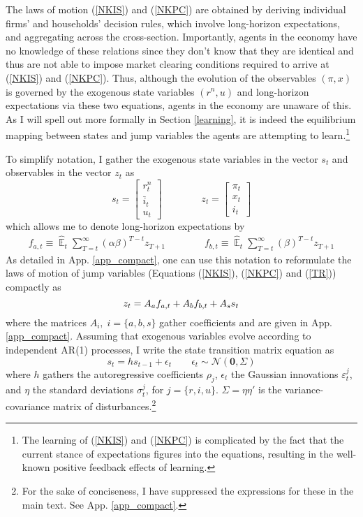 \documentclass[11pt]{article}
\renewcommand{\[}{\begin{equation}}
\renewcommand{\]}{\end{equation}}
\DeclareMathOperator{\E}{\mathbb{E}}
\begin{document}
The laws of motion (\ref{NKIS}) and (\ref{NKPC}) are obtained by deriving individual firms' and households' decision rules, which involve long-horizon expectations, and aggregating across the cross-section. Importantly, agents in the economy have no knowledge of these relations since they don't know that they are identical and thus are not able to impose market clearing conditions required to arrive at (\ref{NKIS}) and (\ref{NKPC}). Thus, although the evolution of the observables $(\pi,x)$ is governed by the exogenous state variables $(r^n, u)$ and long-horizon expectations via these two equations, agents in the economy are unaware of this. As I will spell out more formally in Section \ref{learning}, it is indeed the equilibrium mapping between states and jump variables the agents are attempting to learn.\footnote{The learning of (\ref{NKIS}) and (\ref{NKPC}) is complicated by the fact that the current stance of expectations figures into the equations, resulting in the well-known positive feedback effects of learning.} 

To simplify notation, I gather the exogenous state variables in the vector $s_t$ and observables in the vector $z_t$ as
\begin{equation}
s_t =  \begin{bmatrix}r_t^n \\ \bar{i}_t \\ u_t \end{bmatrix} \quad \quad \quad \quad  z_t = \begin{bmatrix}\pi_t \\ x_t \\ i_t \end{bmatrix}
\end{equation}
which allows me to denote long-horizon expectations by 
 \begin{align}
f_{a,t}  \equiv  \hat{\E}_t\sum_{T=t}^{\infty} (\alpha\beta)^{T-t } z_{T+1} \quad \quad \quad \quad f_{b,t}  \equiv \hat{\E}_t\sum_{T=t}^{\infty} (\beta)^{T-t } z_{T+1} \label{fafb}
\end{align}
As detailed in App. \ref{app_compact}, one can use this notation to reformulate the laws of motion of jump variables (Equations (\ref{NKIS}), (\ref{NKPC}) and (\ref{TR})) compactly as
\begin{equation}
z_t  = A_af_{a,t} + A_b f_{b,t} + A_s s_t \label{LOM_LR} \\
\end{equation}
where the matrices $A_i, \; i=\{a,b,s\}$ gather coefficients and are given in App. \ref{app_compact}. Assuming that exogenous variables evolve according to independent AR(1) processes, I write the state transition matrix equation as
 \begin{equation}
 s_t  = h s_{t-1} + \epsilon_t  \quad \quad \epsilon_t \sim \mathcal{N}(\mathbf{0}, \Sigma) \label{LOM_s}
 \end{equation}
where $h$ gathers the autoregressive coefficients $\rho_j$, $\epsilon_t$ the Gaussian innovations $\varepsilon_t^j$, and $\eta$ the standard deviations $\sigma_t^j$, for $j=\{r,i,u\}$. $\Sigma = \eta \eta'$  is the variance-covariance matrix of disturbances.\footnote{For the sake of conciseness, I have suppressed the expressions for these in the main text. See App. \ref{app_compact}.}
\end{document}
